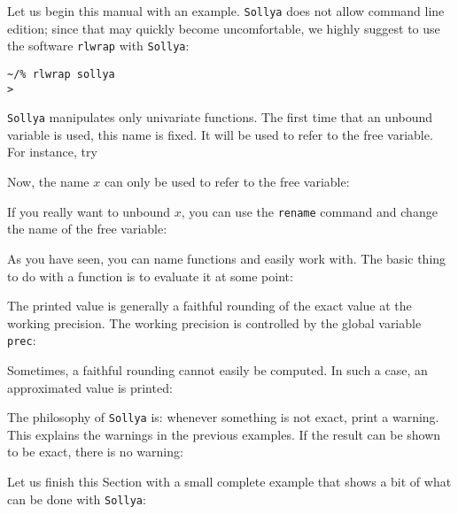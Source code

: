 \documentclass[a4paper]{article}
\newcommand{\com}[1]{\texttt{#1}}
\newcommand{\sollya}{\texttt{Sollya}\xspace}
\newcommand{\rlwrap}{\texttt{rlwrap}\xspace}
\begin{document}
Let us begin this manual with an example. \sollya does not allow command line edition; since that may quickly become uncomfortable, we highly suggest to use the software \rlwrap with \sollya:

\begin{center}\begin{minipage}{15cm}\begin{Verbatim}[frame=single]
~/% rlwrap sollya
>
\end{Verbatim}
\end{minipage}\end{center}

\sollya manipulates only univariate functions. The first time that an unbound variable is used, this name is fixed. It will be used to refer to the free variable. For instance, try



Now, the name $x$ can only be used to refer to the free variable:



If you really want to unbound $x$, you can use the \com{rename} command and change the name of the free variable:



As you have seen, you can name functions and easily work with. The basic thing to do with a function is to evaluate it at some point:



The printed value is generally a faithful rounding of the exact value at the working precision. The working precision is controlled by the global variable \com{prec}:



Sometimes, a faithful rounding cannot easily be computed. In such a case, an approximated value is printed:



The philosophy of \sollya is: whenever something is not exact, print a warning. This explains the warnings in the previous examples. If the result can be shown to be exact, there is no warning:



Let us finish this Section with a small complete example that shows a bit of what can be done with \sollya:


\end{document}
